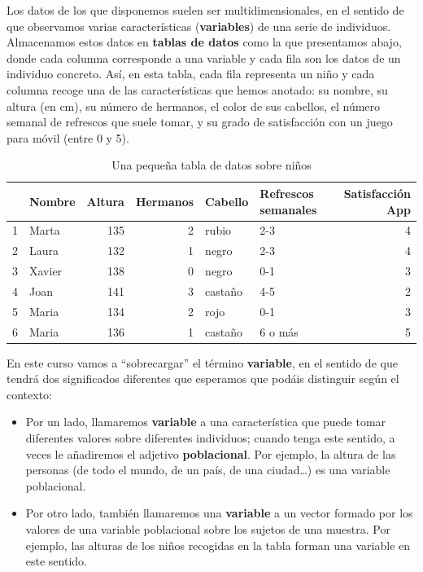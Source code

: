 \documentclass[
  letterpaper,
  DIV=11,
  numbers=noendperiod]{scrreprt}
\begin{document}
Los datos de los que disponemos suelen ser multidimensionales, en el
sentido de que observamos varias características (\textbf{variables}) de
una serie de individuos. Almacenamos estos datos en \textbf{tablas de
datos} como la que presentamos abajo, donde cada columna corresponde a
una variable y cada fila son los datos de un individuo concreto. Así, en
esta tabla, cada fila representa un niño y cada columna recoge una de
las características que hemos anotado: su nombre, su altura (en cm), su
número de hermanos, el color de sus cabellos, el número semanal de
refrescos que suele tomar, y su grado de satisfacción con un juego para
móvil (entre 0 y 5).

\begin{table}

\caption{Una pequeña tabla de datos sobre niños}
\centering
\begin{tabular}[t]{l|l|r|r|l|l|r}
\hline
  & Nombre & Altura & Hermanos & Cabello & Refrescos semanales & Satisfacción App\\
\hline
1 & Marta & 135 & 2 & rubio & 2-3 & 4\\
\hline
2 & Laura & 132 & 1 & negro & 2-3 & 4\\
\hline
3 & Xavier & 138 & 0 & negro & 0-1 & 3\\
\hline
4 & Joan & 141 & 3 & castaño & 4-5 & 2\\
\hline
5 & Maria & 134 & 2 & rojo & 0-1 & 3\\
\hline
6 & Maria & 136 & 1 & castaño & 6 o más & 5\\
\hline
\end{tabular}
\end{table}


En este curso vamos a ``sobrecargar'' el término \textbf{variable}, en
el sentido de que tendrá dos significados diferentes que esperamos que
podáis distinguir según el contexto:

\begin{itemize}
\item
  Por un lado, llamaremos \textbf{variable} a una característica que
  puede tomar diferentes valores sobre diferentes individuos; cuando
  tenga este sentido, a veces le añadiremos el adjetivo
  \textbf{poblacional}. Por ejemplo, la altura de las personas (de todo
  el mundo, de un país, de una ciudad\ldots) es una variable
  poblacional.
\item
  Por otro lado, también llamaremos una \textbf{variable} a un vector
  formado por los valores de una variable poblacional sobre los sujetos
  de una muestra. Por ejemplo, las alturas de los niños recogidas en la
  tabla forman una variable en este sentido.
\end{itemize}
\end{document}
